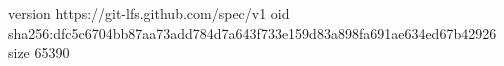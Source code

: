 version https://git-lfs.github.com/spec/v1
oid sha256:dfc5c6704bb87aa73add784d7a643f733e159d83a898fa691ae634ed67b42926
size 65390

